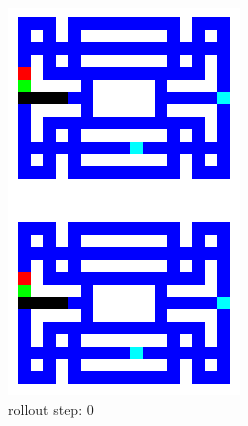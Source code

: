 \begin{figure}[H] 
    \centering
    \begin{subfigure}[b]{0.16\textwidth}
        \includegraphics[width=\textwidth]{./Images/env_model_rollout_0.png}
  		\caption*{\footnotesize rollout step: 0} 
  		\label{fig:rollout_0} 
    \end{subfigure}
	\hspace{0mm}%
    \begin{subfigure}[b]{0.16\textwidth}

\end{subfigure}
\end{figure}
